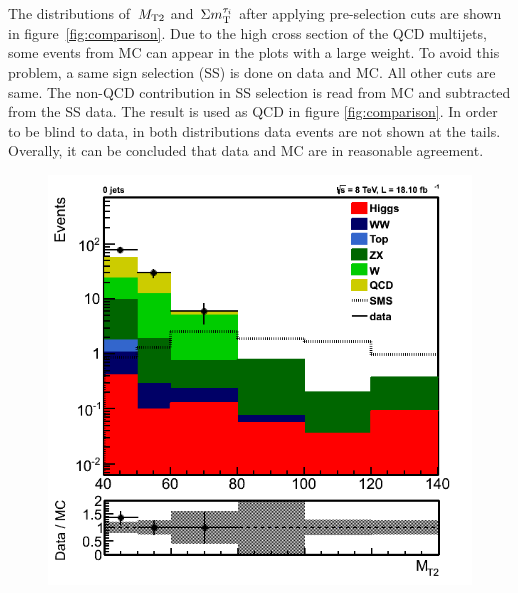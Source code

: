 The distributions of $\,{M_{\rm T2}}$ and $\,\Sigma m_{\rm T}^{\tau_i}$ after applying pre-selection cuts are shown in figure~\ref{fig:comparison}. Due to the high cross section of the QCD multijets, some events from MC can appear in the plots with a large weight. To avoid this problem,
a same sign selection (SS) is done on data and MC. All other cuts are same. The non-QCD contribution in SS selection is read from MC and 
subtracted from the SS data. The result is used as QCD in figure \ref{fig:comparison}. 
In order to be blind to data, in both distributions data events are not shown at the tails. Overally, it can be concluded that data and MC are in reasonable agreement. 
\begin{figure}[htbp]
\centering
\includegraphics[angle=0,scale=0.35]{QCDbginTauTau/Bin1_QCDdatadriven_Samesign.png}

\end{figure}
